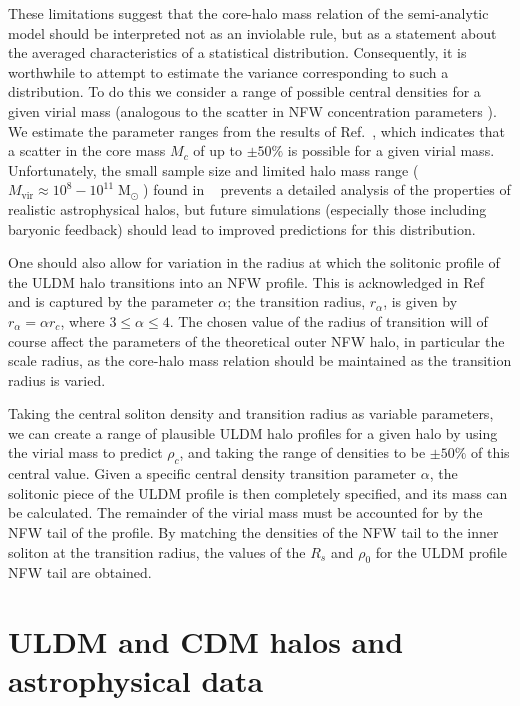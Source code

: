 \documentclass{pasa}%
\begin{document}
These limitations suggest that the core-halo mass relation of the semi-analytic model should be interpreted not as an inviolable rule, but as a statement about the averaged characteristics of a statistical distribution. Consequently, it is worthwhile to attempt to estimate the variance corresponding to such a distribution. To do this we consider a range of possible central densities for a given virial mass (analogous to the scatter in NFW concentration parameters \cite{Maccio:2008pcd}). We estimate the parameter ranges from the results of Ref.~\cite{Schive:2014hza}, which indicates that a scatter in the core mass $M_c$ of up to $\pm 50\%$ is possible for a given virial mass. Unfortunately, the small sample size and limited halo mass range ($ M_{\mathrm{vir}} \approx 10^8-10^{11} \operatorname{M}_{\odot}$) found in ~\cite{Schive:2014hza}  prevents a detailed analysis of the properties of realistic astrophysical halos,  but future simulations (especially those including baryonic feedback) should lead to improved predictions for this distribution. 

One should also allow for variation in the radius at which the solitonic profile of the ULDM halo transitions into an NFW profile. This is acknowledged in Ref~\cite{Robles:2018fur} and is captured by the parameter $\alpha$; the transition radius, $r_{\alpha}$, is given by $r_{\alpha} = \alpha r_c$, where $3 \leq \alpha \leq 4$. The chosen value of the radius of transition will of course affect the parameters of the theoretical outer NFW halo, in particular the scale radius, as the core-halo mass relation should be maintained as the transition radius is varied.

Taking the central soliton density and transition radius as variable parameters, we can create a range of plausible ULDM halo profiles for a given halo by using the virial mass to predict $\rho_c$, and taking the range of densities to be $\pm 50\% $ of this central value. Given a specific central density transition parameter $\alpha$, the solitonic piece of the ULDM profile is then completely specified, and its mass can be calculated. The remainder of the virial mass must be accounted for by the NFW tail of the profile. By matching the densities of the NFW tail to the inner soliton at the transition radius, the values of the $R_s$ and $\rho_0$ for the ULDM profile NFW tail are obtained.  



\section{ULDM and CDM halos and astrophysical data}\label{sec:velocity}
\end{document}
